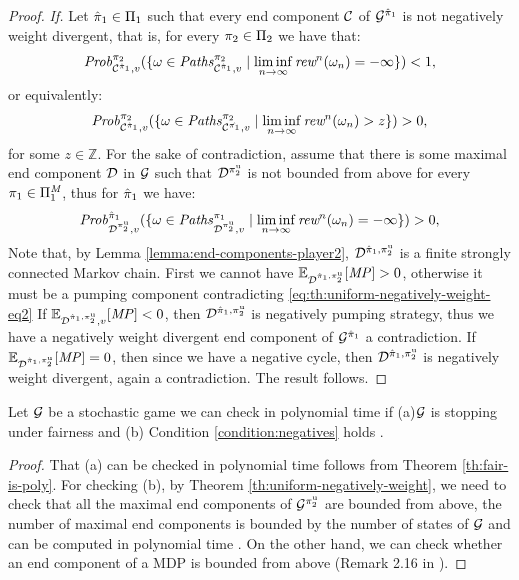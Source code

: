 \begin{proof}
\emph{If.} Let $\hat{\pi}_{1} \in \Pi_{1}$ such that every end component $\mathcal{C}$ of $\mathcal{G}^{\hat{\pi}_{1}}$ is not negatively weight divergent, that is, for every 
$\pi_{2} \in \Pi_{2}$ we have that:
\[
\mathit{Prob}^{\pi_{2}}_{\mathcal{C}^{\hat{\pi}_{1}},v}(\{ \omega \in \mathit{Paths}^{\pi_{2}}_{\mathcal{C}^{\hat{\pi}_{1}},v} \mid \liminf_{n \to \infty} \textit{rew}^n(\omega_n) = - \infty \}) < 1,
\]
or equivalently:
\[
\mathit{Prob}^{\pi_{2}}_{\mathcal{C}^{\hat{\pi}_{1}},v}(\{ \omega \in \mathit{Paths}^{\pi_{2}}_{\mathcal{C}^{\hat{\pi_{1}}},v}  \mid \liminf_{n \to \infty} \textit{rew}^n(\omega_n) > z \}) > 0,
\]
for some $z \in \mathbb{Z}$.  For the sake of contradiction, assume that there is some maximal end component $\mathcal{D}$ in $\mathcal{G}$ such that $\mathcal{D}^{\pi^{\mathrm{u}}_{2}}$ is not bounded from above for every $\pi_{1} \in \Pi^{\textit{M}}_{1}$, thus for $\hat{\pi}_{1}$ we have: 
\begin{equation}\label{eq:th:uniform-negatively-weight-eq2}
\mathit{Prob}^{\hat{\pi}_{1}}_{\mathcal{D}^{\pi^{\mathrm{u}}_{2}},v}(\{ \omega \in \mathit{Paths}^{\pi_{1}}_{\mathcal{D}^{\pi^{\mathrm{u}}_{2}},v} \mid \liminf_{n \to \infty} \textit{rew}^n(\omega_n) = -\infty \}) > 0,
\end{equation}
	Note that, by Lemma \ref{lemma:end-components-player2}, $\mathcal{D}^{\hat{\pi}_{1}, \pi^{\mathrm{u}}_{2}}$	is a finite strongly connected Markov chain.  First we cannot have $\mathbb{E}_{\mathcal{D}^{\hat{\pi}_{1}, \pi^{\mathrm{u}}_{2}}}[\mathit{MP}] > 0$, otherwise it must be a pumping component contradicting \ref{eq:th:uniform-negatively-weight-eq2}  If $\mathbb{E}_{\mathcal{D}^{\hat{\pi}_{1}, \pi^{\mathrm{u}}_{2}},v}[\mathit{MP}]< 0$, then $\mathcal{D}^{\hat{\pi}_{1}, \pi^{\mathrm{u}}_{2}}$ is negatively pumping strategy, thus we have a negatively weight divergent end component of $\mathcal{G}^{\hat{\pi}_{1}}$ a contradiction. 
	If $\mathbb{E}_{\mathcal{D}^{\hat{\pi}_{1}, \pi^{\mathrm{u}}_{2}}}[\mathit{MP}] =  0$, then since we have a negative cycle, then $\mathcal{D}^{\hat{\pi}_{1}, \pi^{\mathrm{u}}_{2}}$ is negatively weight divergent, again a contradiction.  The result follows.
\end{proof}
	
\begin{theorem} Let $\mathcal{G}$ be a stochastic game we can check in polynomial time if 
(a)$\mathcal{G}$ is stopping under fairness and (b) Condition \ref{condition:negatives} holds .
\end{theorem}	
\begin{proof} That  (a) can be checked in polynomial time  follows from Theorem \ref{th:fair-is-poly}. 
For checking  (b), by Theorem \ref{th:uniform-negatively-weight},  we need to check that all the maximal end components of $\mathcal{G}^{\pi^{\mathrm{u}}_{2}}$
are bounded from above, the number of maximal end components is bounded by the number of states of $\mathcal{G}$ and can be computed in polynomial time \cite{BaierK08}. On the other hand, we can check whether an end component of a MDP is bounded from above (Remark 2.16 in \cite{DBLP:conf/lics/Baier0DGS18}).
\end{proof}
	


